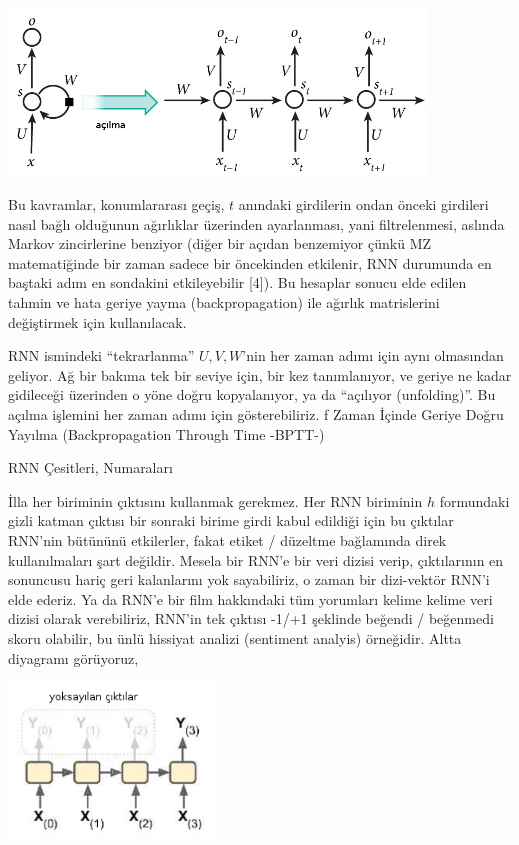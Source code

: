 \documentclass[12pt,fleqn]{article}\usepackage{../../common}
\begin{document}
\includegraphics[width=30em]{rnn_07.jpg}

Bu kavramlar, konumlararası geçiş, $t$ anındaki girdilerin ondan önceki
girdileri nasıl bağlı olduğunun ağırlıklar üzerinden ayarlanması, yani
filtrelenmesi, aslında Markov zincirlerine benziyor (diğer bir açıdan
benzemiyor çünkü MZ matematiğinde bir zaman sadece bir öncekinden
etkilenir, RNN durumunda en baştaki adım en sondakini etkileyebilir
[4]). Bu hesaplar sonucu elde edilen tahmin ve hata geriye yayma
(backpropagation) ile ağırlık matrislerini değiştirmek için kullanılacak.

RNN ismindeki ``tekrarlanma'' $U,V,W$'nin her zaman adımı için aynı
olmasından geliyor. Ağ bir bakıma tek bir seviye için, bir kez
tanımlanıyor, ve geriye ne kadar gidileceği üzerinden o yöne doğru
kopyalanıyor, ya da ``açılıyor (unfolding)''.  Bu açılma işlemini her zaman
adımı için gösterebiliriz.  f Zaman İçinde Geriye Doğru Yayılma
(Backpropagation Through Time -BPTT-)

RNN Çesitleri, Numaraları

İlla her biriminin çıktısını kullanmak gerekmez. Her RNN biriminin $h$
formundaki gizli katman çıktısı bir sonraki birime girdi kabul edildiği
için bu çıktılar RNN'nin bütününü etkilerler, fakat etiket / düzeltme
bağlamında direk kullanılmaları şart değildir. Mesela bir RNN'e bir veri
dizisi verip, çıktılarının en sonuncusu hariç geri kalanlarını yok
sayabiliriz, o zaman bir dizi-vektör RNN'i elde ederiz. Ya da RNN'e bir
film hakkındaki tüm yorumları kelime kelime veri dizisi olarak verebiliriz,
RNN'in tek çıktısı -1/+1 şeklinde beğendi / beğenmedi skoru olabilir, bu
ünlü hissiyat analizi (sentiment analyis) örneğidir. Altta diyagramı
görüyoruz,

\includegraphics[width=15em]{rnn_05.png}
\end{document}
